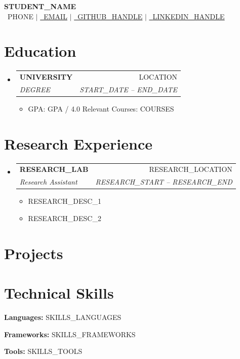 \documentclass[letterpaper,11pt]{article}
\makeatletter
\newcommand{\resumeItem}[1]{
  \item\small{#1 \vspace{-2pt}}
}
\newcommand{\resumeSubheading}[4]{
  \vspace{-2pt}\item
    \begin{tabular*}{0.97\textwidth}[t]{l@{\extracolsep{\fill}}r}
      \textbf{#1} & #2 \\
      \textit{\small#3} & \textit{\small #4} \\
    \end{tabular*}\vspace{-7pt}
}
\newcommand{\resumeItemListStart}{\begin{itemize}}
\newcommand{\resumeItemListEnd}{\end{itemize}\vspace{-5pt}}
\newcommand{\resumeSubHeadingListStart}{\begin{itemize}[leftmargin=0.15in, label={}]}
\newcommand{\resumeSubHeadingListEnd}{\end{itemize}}
\makeatother
\begin{document}
\begin{center}
  \textbf{\Huge \scshape {{STUDENT_NAME}}} \\ \vspace{1pt}
  \small
  \faPhone\ {{PHONE}} $|$
  \href{mailto:{{EMAIL}}}{\faEnvelope\ \underline{{{EMAIL}}}} $|$
  \href{{{GITHUB_URL}}}{\faGithub\ \underline{{{GITHUB_HANDLE}}}} $|$
  \href{{{LINKEDIN_URL}}}{\faLinkedin\ \underline{{{LINKEDIN_HANDLE}}}}
\end{center}

\section{Education}
\resumeSubHeadingListStart
  \resumeSubheading
    {{{UNIVERSITY}}}{{{LOCATION}}}
    {{{DEGREE}}}{{{START_DATE}} -- {{END_DATE}}}
    \resumeItemListStart
      \resumeItem{GPA: {{GPA}} / 4.0 \quad
                  Relevant Courses: {{COURSES}}}
    \resumeItemListEnd
\resumeSubHeadingListEnd

\section{Research Experience}
\resumeSubHeadingListStart
  \resumeSubheading
    {{{RESEARCH_LAB}}}{{{RESEARCH_LOCATION}}}
    {Research Assistant}{{{RESEARCH_START}} -- {{RESEARCH_END}}}
    \resumeItemListStart
      \resumeItem{{{RESEARCH_DESC_1}}}
      \resumeItem{{{RESEARCH_DESC_2}}}
    \resumeItemListEnd
\resumeSubHeadingListEnd

\section{Projects}
\resumeSubHeadingListStart
\resumeSubHeadingListEnd

\section{Technical Skills}
\begin{itemize}[leftmargin=0.15in, label={}]
  \small{
    \item \textbf{Languages:}  {{SKILLS_LANGUAGES}}  \\
    \item \textbf{Frameworks:} {{SKILLS_FRAMEWORKS}} \\
    \item \textbf{Tools:}      {{SKILLS_TOOLS}}
  }
\end{itemize}

\end{document}
